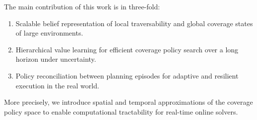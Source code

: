 \documentclass[letterpaper]{article} %
\newcommand{\phdone}[1]{} %
\newcommand{\acomm}[1]{{\color{cyan}Ali:#1}} %
\begin{document}
%
%
\phdone{Contributions}
The main contribution of this work %
is in three-fold:
%
%
\vspace{-4pt}
\begin{enumerate}[label={\arabic*)}]
  \itemsep0em 
  \setlength{\itemsep}{0pt}
  \setlength{\parskip}{0pt}
\item Scalable belief representation of local traversability and global coverage states of large environments. %
	\item Hierarchical value learning for efficient coverage policy search over a long horizon under uncertainty.
	\item Policy reconciliation between planning episodes for adaptive and resilient execution in the real world.
\end{enumerate}
\vspace{-4pt}
%
More precisely, we introduce spatial and temporal approximations of the coverage policy space to enable computational tractability for real-time online solvers.
\end{document}
